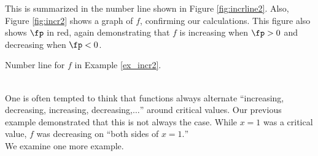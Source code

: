 {This is summarized in the number line shown in Figure \ref{fig:incrline2}. Also, Figure \ref{fig:incr2} shows a graph of $f$, confirming our calculations. This figure also shows $\fp$ in red, again demonstrating that $f$ is increasing when $\fp>0$ and decreasing when $\fp<0$.\\

\noindent\begin{minipage}{\textwidth}\centering
{}
\captionsetup{type=figure}%
\caption{Number line for $f$ in Example \ref{ex_incr2}.}\label{fig:incrline2}
\end{minipage}

}\\

One is often tempted to think that functions always alternate ``increasing, decreasing, increasing, decreasing,$\ldots$'' around critical values. Our previous example demonstrated that this is not always the case. While $x=1$ was a critical value, $f$ was decreasing on ``both sides of $x=1.$''\\

We examine one more example.\\

